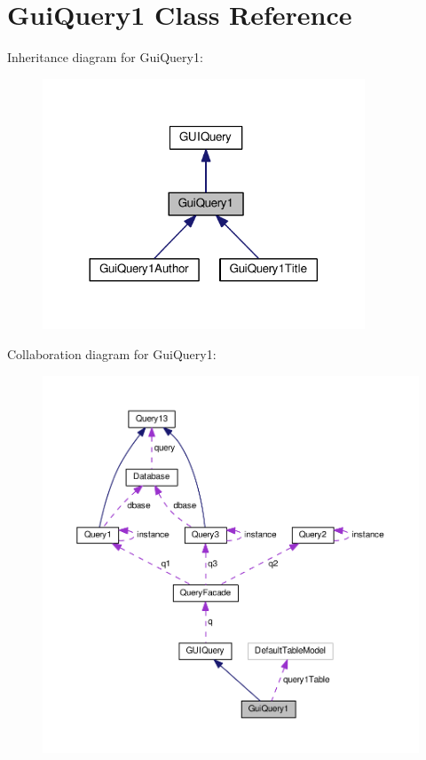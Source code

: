 \hypertarget{classGuiQuery1}{}\section{Gui\+Query1 Class Reference}
\label{classGuiQuery1}


Inheritance diagram for Gui\+Query1\+:\nopagebreak
\begin{figure}[H]
\begin{center}
\leavevmode
\includegraphics[width=272pt]{classGuiQuery1__inherit__graph}
\end{center}
\end{figure}


Collaboration diagram for Gui\+Query1\+:\nopagebreak
\begin{figure}[H]
\begin{center}
\leavevmode
\includegraphics[width=350pt]{classGuiQuery1__coll__graph}
\end{center}
\end{figure}
